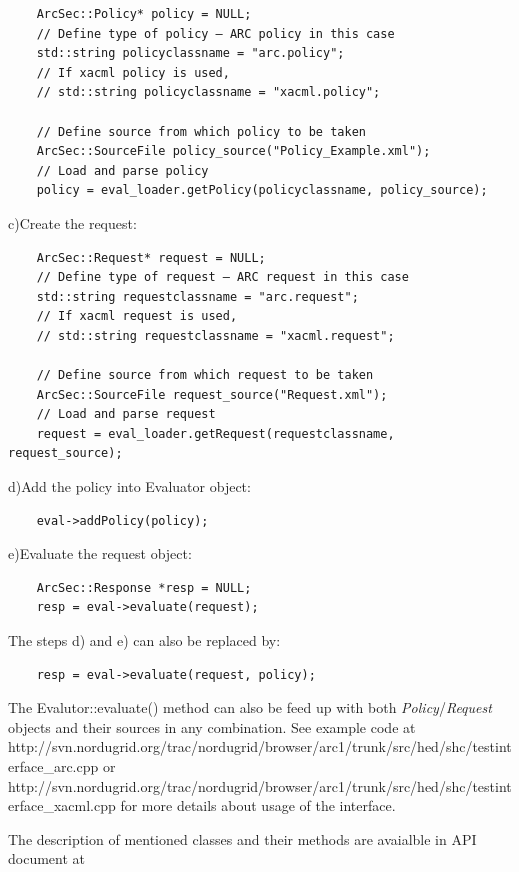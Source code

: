 \documentclass{article}                            %
\begin{document}
\begin{verbatim}
    ArcSec::Policy* policy = NULL; 
    // Define type of policy – ARC policy in this case
    std::string policyclassname = "arc.policy"; 
    // If xacml policy is used, 
    // std::string policyclassname = "xacml.policy"; 

    // Define source from which policy to be taken
    ArcSec::SourceFile policy_source("Policy_Example.xml"); 
    // Load and parse policy
    policy = eval_loader.getPolicy(policyclassname, policy_source); 
\end{verbatim}

c)Create the request:
\begin{verbatim}
    ArcSec::Request* request = NULL;
    // Define type of request – ARC request in this case
    std::string requestclassname = "arc.request";
    // If xacml request is used, 
    // std::string requestclassname = "xacml.request"; 

    // Define source from which request to be taken
    ArcSec::SourceFile request_source("Request.xml");
    // Load and parse request
    request = eval_loader.getRequest(requestclassname, request_source);
\end{verbatim}

d)Add the policy into Evaluator object:
\begin{verbatim}
    eval->addPolicy(policy);
\end{verbatim}

e)Evaluate the request object:
\begin{verbatim}
    ArcSec::Response *resp = NULL;
    resp = eval->evaluate(request);
\end{verbatim}

The steps d) and e) can also be replaced by:

\begin{verbatim}
    resp = eval->evaluate(request, policy);
\end{verbatim}

The Evalutor::evaluate() method can also be feed up with both \textit{Policy}/\textit{Request} objects and their sources in any combination. See example code at http://svn.nordugrid.org/trac/nordugrid/browser/arc1/trunk/src/hed/shc/testinterface\_arc.cpp or http://svn.nordugrid.org/trac/nordugrid/browser/arc1/trunk/src/hed/shc/testinterface\_xacml.cpp for more details about usage of the interface.

The description of mentioned classes and their methods are avaialble in  API document at
\end{document}
